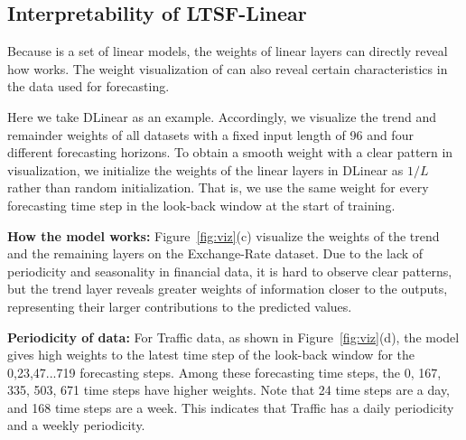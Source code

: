 \subsection{Interpretability of LTSF-Linear} 
Because \modelname is a set of linear models, the weights of linear layers can directly reveal how \modelname works. The weight visualization of \modelname can also reveal certain characteristics in the data used for forecasting.

Here we take DLinear as an example. Accordingly, we visualize the trend and remainder weights of all datasets with a fixed input length of 96 and four different forecasting horizons. To obtain a smooth weight with a clear pattern in visualization, we initialize the weights of the linear layers in DLinear as $1/L$ rather than random initialization. That is, we use the same weight for every forecasting time step in the look-back window at the start of training. 

\textbf{How the model works:} Figure~\ref{fig:viz}(c) visualize the weights of the trend and the remaining layers on the Exchange-Rate dataset. Due to the lack of periodicity and seasonality in financial data, it is hard to observe clear patterns, but the trend layer reveals greater weights of information closer to the outputs, representing their larger contributions to the predicted values.

\textbf{Periodicity of data:} For Traffic data, as shown in Figure~\ref{fig:viz}(d), the model gives high weights to the latest time step of the look-back window for the {0,23,47...719} forecasting steps. Among these forecasting time steps, the {0, 167, 335, 503, 671} time steps have higher weights. Note that 24 time steps are a day, and 168 time steps are a week. This indicates that Traffic has a daily periodicity and a weekly periodicity.

